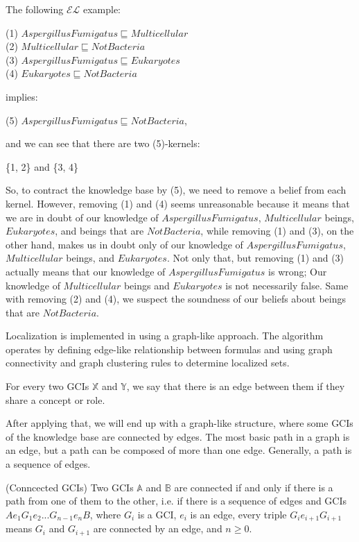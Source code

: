 The following $\mathcal{EL}$ example:
\begin{center}
(1) $AspergillusFumigatus \sqsubseteq Multicellular $ \\
(2) $Multicellular \sqsubseteq NotBacteria$ \\
(3) $AspergillusFumigatus \sqsubseteq Eukaryotes$ \\
(4) $Eukaryotes \sqsubseteq NotBacteria$ 
\end{center}
implies:
\begin{center}
(5) $AspergillusFumigatus \sqsubseteq NotBacteria$,
\end{center}
and we can see that there are two (5)-kernels:
\begin{center}
\{1, 2\} and \{3, 4\}
\end{center}

So, to contract the knowledge base by (5), we need to remove a belief from each kernel. However, removing (1) and (4) seems unreasonable because it means that we are in doubt of our knowledge of $AspergillusFumigatus$, $Multicellular$ beings, $Eukaryotes$, and beings that are $NotBacteria$, while removing (1) and (3), on the other hand, makes us in doubt only of our knowledge of $AspergillusFumigatus$, $Multicellular$ beings, and $Eukaryotes$. Not only that, but removing (1) and (3) actually means that our knowledge of $AspergillusFumigatus$ is wrong; Our knowledge of $Multicellular$ beings and $Eukaryotes$ is not necessarily false. Same with removing (2) and (4), we suspect the soundness of our beliefs about beings that are $NotBacteria$.

Localization is implemented in \cite{zwei} using a graph-like approach. The algorithm operates by defining edge-like relationship between formulas and using graph connectivity and graph clustering rules to determine localized sets. 

\begin{defn}
For every two GCIs $\mathbb{X}$ and $\mathbb{Y}$, we say that there is an edge between them if they share a concept or role.
\end{defn}

After applying that, we will end up with a graph-like structure, where some GCIs of the knowledge base are connected by edges. The most basic path in a graph is an edge, but a path can be composed of more than one edge. Generally, a path is a sequence of edges.

\begin{defn}(Conncected GCIs)
Two GCIs $\mathbb{A}$ and $\mathbb{B}$ are connected if and only if there is a path from one of them to the other, i.e. if there is a sequence of edges and GCIs $Ae_1G_1e_2 ... G_{n-1}e_nB$, where $G_i$ is a GCI, $e_i$ is an edge, every triple $G_ie_{i+1}G_{i+1}$ means $G_i$ and $G_{i+1}$ are connected by an edge, and $n \geq 0$.
\end{defn}

